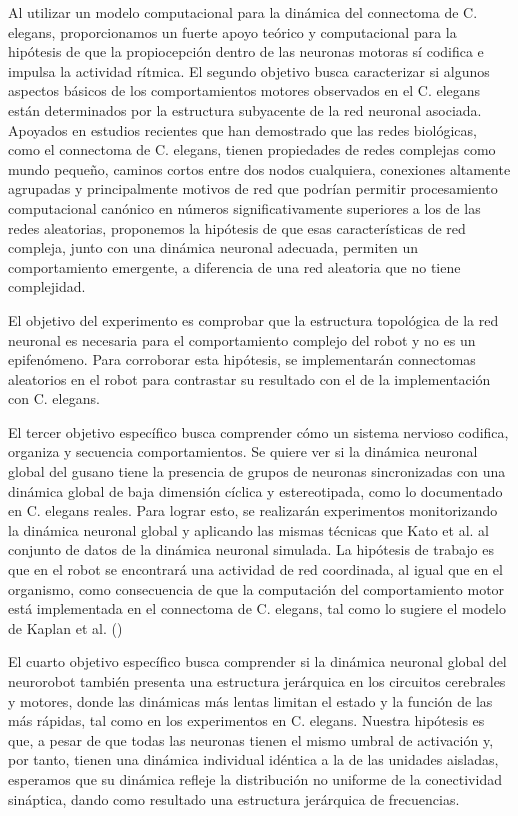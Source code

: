  Al utilizar un modelo computacional para la dinámica del connectoma de C. elegans, proporcionamos un fuerte apoyo teórico y computacional para la hipótesis de que la propiocepción dentro de las neuronas motoras sí codifica e impulsa la actividad rítmica. El segundo objetivo busca caracterizar si algunos aspectos básicos de los comportamientos motores observados en el C. elegans están determinados por la estructura subyacente de la red neuronal asociada. Apoyados en estudios recientes que han demostrado que las redes biológicas, como el connectoma de C. elegans, tienen propiedades de redes complejas como mundo pequeño, caminos cortos entre dos nodos cualquiera, conexiones altamente agrupadas y principalmente motivos de red que podrían permitir procesamiento computacional canónico en números significativamente superiores a los de las redes aleatorias, proponemos la hipótesis de que esas características de red compleja, junto con una dinámica neuronal adecuada, permiten un comportamiento emergente, a diferencia de una red aleatoria que no tiene complejidad.
 
 El objetivo del experimento es comprobar que la estructura topológica de la red neuronal es necesaria para el comportamiento complejo del robot y no es un epifenómeno. Para corroborar esta hipótesis, se implementarán connectomas aleatorios en el robot para contrastar su resultado con el de la implementación con C. elegans.
 
 El tercer objetivo específico busca comprender cómo un sistema nervioso codifica, organiza y secuencia comportamientos. Se quiere ver si la dinámica neuronal global del gusano tiene la presencia de grupos de neuronas sincronizadas con una dinámica global de baja dimensión cíclica y estereotipada, como lo documentado en C. elegans reales. Para lograr esto, se realizarán experimentos monitorizando la dinámica neuronal global y aplicando las mismas técnicas que Kato et al. al conjunto de datos de la dinámica neuronal simulada. La hipótesis de trabajo es que en el robot se encontrará una actividad de red coordinada, al igual que en el organismo, como consecuencia de que la computación del comportamiento motor está implementada en el connectoma de C. elegans, tal como lo sugiere el modelo de Kaplan et al. ()
 
 
 El cuarto objetivo específico busca comprender si la dinámica neuronal global del neurorobot también presenta una estructura jerárquica en los circuitos cerebrales y motores, donde las dinámicas más lentas limitan el estado y la función de las más rápidas, tal como en los experimentos en C. elegans. Nuestra hipótesis es que, a pesar de que todas las neuronas tienen el mismo umbral de activación y, por tanto, tienen una dinámica individual idéntica a la de las unidades aisladas, esperamos que su dinámica refleje la distribución no uniforme de la conectividad sináptica, dando como resultado una estructura jerárquica de frecuencias.
 
